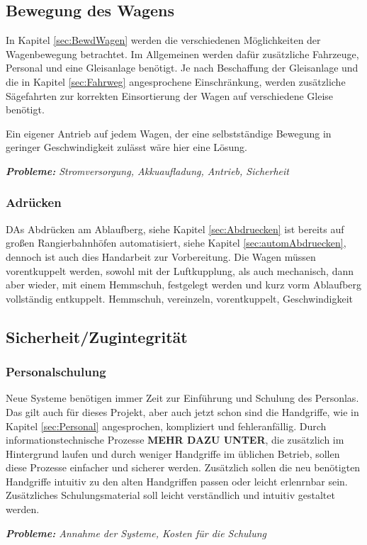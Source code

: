 \subsection{Bewegung des Wagens}
In Kapitel \ref{sec:BewdWagen} werden die verschiedenen Möglichkeiten der Wagenbewegung betrachtet. Im Allgemeinen werden dafür zusätzliche Fahrzeuge, Personal und eine Gleisanlage benötigt. Je nach Beschaffung der Gleisanlage und die in Kapitel \ref{sec:Fahrweg} angesprochene Einschränkung, werden zusätzliche Sägefahrten zur korrekten Einsortierung der Wagen auf verschiedene Gleise benötigt. \par
Ein eigener Antrieb auf jedem Wagen, der eine selbstständige Bewegung in geringer Geschwindigkeit zulässt wäre hier eine Lösung.\par
\textit{\textbf{Probleme:} Stromversorgung, Akkuaufladung, Antrieb, Sicherheit}
\subsubsection{Adrücken}
DAs Abdrücken am Ablaufberg, siehe Kapitel \ref{sec:Abdruecken} ist bereits auf großen Rangierbahnhöfen automatisiert, siehe Kapitel \ref{sec:automAbdruecken}, dennoch ist auch dies Handarbeit zur Vorbereitung. Die Wagen müssen vorentkuppelt werden, sowohl mit der Luftkupplung, als auch mechanisch, dann aber wieder, mit einem Hemmschuh, festgelegt werden und kurz vorm Ablaufberg vollständig entkuppelt. 
Hemmschuh, vereinzeln, vorentkuppelt, Geschwindigkeit
\subsection{Sicherheit/Zugintegrität}
\subsubsection{Personalschulung}
Neue Systeme benötigen immer Zeit zur Einführung und Schulung des Personlas. Das gilt auch für dieses Projekt, aber auch jetzt schon sind die Handgriffe, wie in Kapitel \ref{sec:Personal} angesprochen, kompliziert und fehleranfällig. Durch informationstechnische Prozesse \textbf{MEHR DAZU UNTER}, die zusätzlich im Hintergrund laufen und durch weniger Handgriffe im üblichen Betrieb, sollen diese Prozesse einfacher und sicherer werden. Zusätzlich sollen die neu benötigten Handgriffe intuitiv zu den alten Handgriffen passen oder leicht erlenrnbar sein. Zusätzliches Schulungsmaterial soll leicht verständlich und intuitiv gestaltet werden.\par
\textit{\textbf{Probleme:} Annahme der Systeme, Kosten für die Schulung}

